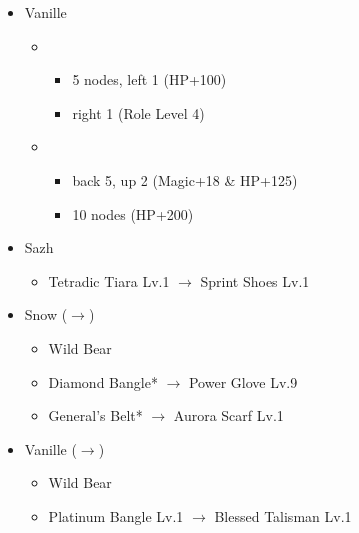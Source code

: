 \begin{menu}
\begin{itemize}
\begin{itemize}
\begin{itemize}
\begin{itemize}
						\end{itemize}
				\end{itemize}
			\item Vanille
				\begin{itemize}
					\item \sab
						\begin{itemize}
							\item 5 nodes, left 1 (HP+100)
							\item right 1 (Role Level 4)
						\end{itemize}
					\item \med
						\begin{itemize}
							\item back 5, up 2 (Magic+18 \& HP+125)
							\item 10 nodes (HP+200)
						\end{itemize}
				\end{itemize}
		\end{itemize}
	\equip
		\begin{itemize}
			\item Sazh
				\begin{itemize}
					\item Tetradic Tiara Lv.1 $\rightarrow$ Sprint Shoes Lv.1
				\end{itemize}			
			\item Snow ($\rightarrow$)
				\begin{itemize}
					\item Wild Bear
					\item Diamond Bangle* $\rightarrow$ Power Glove Lv.9
					\item General's Belt* $\rightarrow$ Aurora Scarf Lv.1
				\end{itemize}
			\item Vanille ($\rightarrow$)
				\begin{itemize}
					\item Wild Bear
					\item Platinum Bangle Lv.1 $\rightarrow$ Blessed Talisman Lv.1
				\end{itemize}				
		\end{itemize}
	\end{itemize}
\end{menu}

\renewcommand{\first}{[1] Tireless Charge (\com/\com/\med)}
\renewcommand{\second}{[2] Devastation (\com/\com/\sab)}
\renewcommand{\third}{[3] Premeditation (\syn/\sen/\sab)}
\renewcommand{\fourth}{[4] Tri-Disaster (\rav/\rav/\rav)}
\renewcommand{\fifth}{[5] Dirty Fighting (\com/\sen/\sab)}
\renewcommand{\sixth}{[6] Mystic Tower (\rav/\sen/\rav)}

